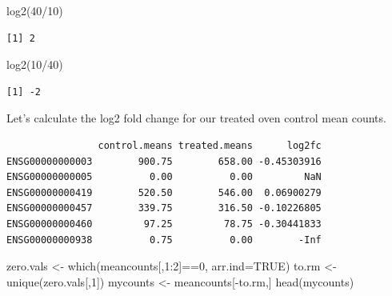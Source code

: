 \documentclass[
  letterpaper,
  DIV=11,
  numbers=noendperiod]{scrartcl}
\newenvironment{Shaded}{\begin{snugshade}}{\end{snugshade}}
\newcommand{\AttributeTok}[1]{\textcolor[rgb]{0.40,0.45,0.13}{#1}}
\newcommand{\CommentTok}[1]{\textcolor[rgb]{0.37,0.37,0.37}{#1}}
\newcommand{\ConstantTok}[1]{\textcolor[rgb]{0.56,0.35,0.01}{#1}}
\newcommand{\DecValTok}[1]{\textcolor[rgb]{0.68,0.00,0.00}{#1}}
\newcommand{\FunctionTok}[1]{\textcolor[rgb]{0.28,0.35,0.67}{#1}}
\newcommand{\NormalTok}[1]{\textcolor[rgb]{0.00,0.23,0.31}{#1}}
\newcommand{\OtherTok}[1]{\textcolor[rgb]{0.00,0.23,0.31}{#1}}
\newcommand{\SpecialCharTok}[1]{\textcolor[rgb]{0.37,0.37,0.37}{#1}}
\begin{document}
\begin{Shaded}
\begin{Highlighting}[]
\FunctionTok{log2}\NormalTok{(}\DecValTok{40}\SpecialCharTok{/}\DecValTok{10}\NormalTok{)}
\end{Highlighting}
\end{Shaded}

\begin{verbatim}
[1] 2
\end{verbatim}

\begin{Shaded}
\begin{Highlighting}[]
\FunctionTok{log2}\NormalTok{(}\DecValTok{10}\SpecialCharTok{/}\DecValTok{40}\NormalTok{)}
\end{Highlighting}
\end{Shaded}

\begin{verbatim}
[1] -2
\end{verbatim}

Let's calculate the log2 fold change for our treated oven control mean
counts.

\begin{Shaded}
\end{Shaded}

\begin{verbatim}
                control.means treated.means      log2fc
ENSG00000000003        900.75        658.00 -0.45303916
ENSG00000000005          0.00          0.00         NaN
ENSG00000000419        520.50        546.00  0.06900279
ENSG00000000457        339.75        316.50 -0.10226805
ENSG00000000460         97.25         78.75 -0.30441833
ENSG00000000938          0.75          0.00        -Inf
\end{verbatim}

\begin{Shaded}
\begin{Highlighting}[]
\NormalTok{zero.vals }\OtherTok{\textless{}{-}} \FunctionTok{which}\NormalTok{(meancounts[,}\DecValTok{1}\SpecialCharTok{:}\DecValTok{2}\NormalTok{]}\SpecialCharTok{==}\DecValTok{0}\NormalTok{, }\AttributeTok{arr.ind=}\ConstantTok{TRUE}\NormalTok{)}
\NormalTok{to.rm }\OtherTok{\textless{}{-}} \FunctionTok{unique}\NormalTok{(zero.vals[,}\DecValTok{1}\NormalTok{])}
\NormalTok{mycounts }\OtherTok{\textless{}{-}}\NormalTok{ meancounts[}\SpecialCharTok{{-}}\NormalTok{to.rm,]}
\FunctionTok{head}\NormalTok{(mycounts)}
\end{Highlighting}
\end{Shaded}
\end{document}
